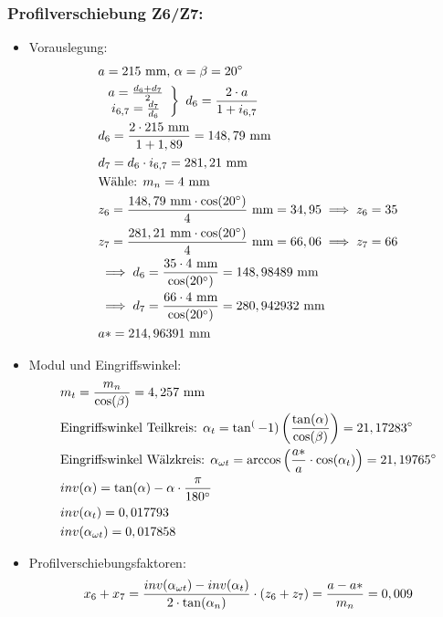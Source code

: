 \subsubsection{Profilverschiebung Z6/Z7:}
\begin{itemize}
\item Vorauslegung:
\begin{align*}
	&a= 215 \text{ mm, } \alpha = \beta = 20^\circ \\
	&\left. \begin{array}{c} a= \frac{d_6 + d_7}{2}\\i_{6,7} = \frac{d_7}{d_6} \end{array} \right\} \text{ }d_6 = \frac{2 \cdot a}{1+i_{6,7}} \\
	&d_6 = \frac{2\cdot 215 \text{ mm}}{1+1,89} = 148,79\text{ mm} \\
	&d_7 = d_6 \cdot i_{6,7} = 281,21 \text{ mm}\\
	&\text{Wähle: }m_n = 4 \text{ mm} \\
	&z_6 = \frac{148,79 \text{ mm} \cdot \cos(20^\circ)}{4 } \text{ mm} = 34,95 \implies z_6 = 35\\
	&z_7 = \frac{281,21 \text{ mm} \cdot \cos(20^\circ)}{4 } \text{ mm} = 66,06 \implies z_7 = 66 \\
	&\implies d_6 = \frac{35 \cdot 4\text{ mm} }{\cos(20^\circ)} = 148,98489 \text{ mm} \\
	&\implies d_7 = \frac{66\cdot 4\text{ mm} }{\cos(20^\circ)} = 280,942932\text{ mm} \\
	&a* = 214,96391 \text{ mm} 
\end{align*}
\item Modul und Eingriffswinkel:
\begin{align*}
	&m_t = \frac{m_n}{\cos(\beta)} = 4,257\text{ mm} \\
	&\text{Eingriffswinkel Teilkreis: } \alpha_t = \tan^(-1) \left( \frac{\tan(\alpha)}{\cos(\beta)} \right) = 21,17283 ^\circ \\
	&\text{Eingriffswinkel Wälzkreis: } \alpha_{\omega t} = \arccos \left( \frac{a*}{a} \cdot \cos(\alpha_t)\right) = 21,19765 ^\circ \\
	&inv(\alpha) = \tan(\alpha) -\alpha \cdot \frac{\pi}{180^\circ} \\
	&inv(\alpha_t) = 0,017793 \\
	&inv(\alpha_{\omega t}) = 0,017858 
\end{align*}
\item Profilverschiebungsfaktoren:
\begin{align*}
	&x_6 + x_7 = \frac{inv(\alpha_{\omega t})-inv(\alpha_{t})}{2 \x \tan(\alpha_n)} \x (z_6 + z_7) = \frac{a - a*}{m_n} = 0,009 \\

\end{align*}
\end{itemize}

